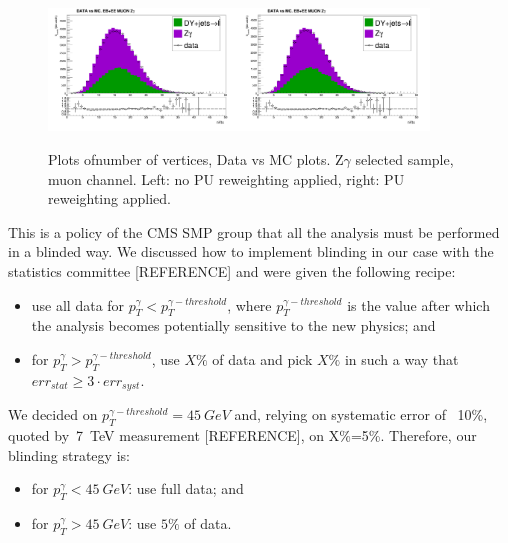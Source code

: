 \begin{figure}[htb]
  \begin{center}
   \includegraphics[width=0.45\textwidth]{../figs/figs_v11/MUON_ZGamma/PrepareYields/c_TotalDATAvsMC_EtaCommon__nVtx_noPU.png}\includegraphics[width=0.45\textwidth]{../figs/figs_v11/MUON_ZGamma/PrepareYields/c_TotalDATAvsMC_EtaCommon__nVtx.png}
  \caption{Plots ofnumber of vertices, Data vs MC plots. Z$\gamma$ selected sample, muon channel. Left: no PU reweighting applied, right: PU reweighting applied. }
  \label{fig:DATAvsMC_nVtx}
  \end{center}
\end{figure}

This is a policy of the CMS SMP group that all the analysis must be performed in a blinded way. We discussed how to implement blinding in our case with the statistics committee [REFERENCE] and were given the following recipe:
\begin{itemize}
  \item use all data for $p_T^{\gamma}<p_T^{\gamma-threshold}$, where $p_T^{\gamma-threshold}$ is the value after which the analysis becomes potentially sensitive to the new physics; and
  \item for $p_T^{\gamma}>p_T^{\gamma-threshold}$, use $X\%$ of data and pick  $X\%$ in such a way that $err_{stat} \geq 3 \cdot err_{syst}$.
\end{itemize}

We decided on $p_T^{\gamma-threshold}=45~GeV$ and, relying on systematic error of ~10\%, quoted by~7~TeV measurement [REFERENCE], on X\%=5\%. Therefore, our blinding strategy is:
\begin{itemize}
  \item for $p_T^{\gamma}<45~GeV$: use full data; and
  \item for $p_T^{\gamma}>45~GeV$: use $5\%$ of data.
\end{itemize}

